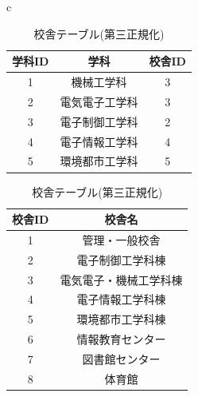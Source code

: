 \documentclass[a4j]{jarticle}
\begin{document}
        \begin{table}[H]
          \begin{center}
            \begin{tabular}{c}

              \begin{minipage}{0.5\hsize}
          \caption{学科テーブル(第三正規化)}
          \label{one3C}
          \begin{center}
            \begin{tabular}{c|c|c}\hline
              学科ID & 学科 & 校舎ID  \\ \hline \hline
              1 & 機械工学科 & 3  \\ \hline
              2 & 電気電子工学科 & 3  \\ \hline
              3 & 電子制御工学科 & 2  \\ \hline
              4 & 電子情報工学科 & 4  \\ \hline
              5 & 環境都市工学科 & 5  \\ \hline
            \end{tabular}
          \end{center}
        \end{minipage}

        \begin{minipage}{0.5\hsize}
            \caption{校舎テーブル(第三正規化)}
            \label{one3D}
            \begin{center}
              \begin{tabular}{c|c}\hline
                校舎ID & 校舎名 \\ \hline \hline
                1 & 管理・一般校舎 \\ \hline
                2 & 電子制御工学科棟 \\ \hline
                3 & 電気電子・機械工学科棟 \\ \hline
                4 & 電子情報工学科棟 \\ \hline
                5 & 環境都市工学科棟 \\ \hline
                6 & 情報教育センター \\ \hline
                7 & 図書館センター \\ \hline
                8 & 体育館 \\ \hline
              \end{tabular}
            \end{center}
          \end{minipage}
        \end{tabular}
      \end{center}
            \end{table}
\end{document}
